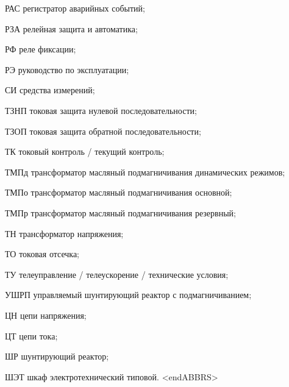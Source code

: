 \begin{list}{}
\item[РАС] регистратор аварийных событий;
\item[РЗА] релейная защита и автоматика;
\item[РФ] реле фиксации;
\item[РЭ] руководство по эксплуатации;
\item[СИ] средства измерений;
\item[ТЗНП] токовая защита нулевой последовательности;
\item[ТЗОП] токовая защита обратной последовательности;
\item[ТК] токовый контроль / текущий контроль;
\item[ТМПд] трансформатор масляный подмагничивания динамических режимов;
\item[ТМПо] трансформатор масляный подмагничивания основной;
\item[ТМПр] трансформатор масляный подмагничивания резервный;
\item[ТН] трансформатор напряжения;
\item[ТО] токовая отсечка;
\item[ТУ] телеуправление / телеускорение / технические условия;
\item[УШРП] управляемый шунтирующий реактор с подмагничиванием;
\item[ЦН] цепи напряжения;
\item[ЦТ] цепи тока;
\item[ШР] шунтирующий реактор;
\item[ШЭТ] шкаф электротехнический типовой.
{\color{white}\fontsize{0.1pt}{0.1pt}\selectfont<endABBRS>}
\end{list}
